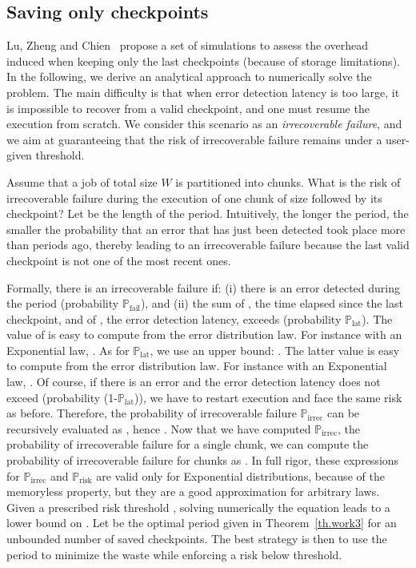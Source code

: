 \documentclass[10pt,table]{article}
\newcommand{\ema}[1]{\ensuremath{#1}\xspace}
\newcommand{\WWW}{\ema{W}}
\newcommand{\Pfa}{\ema{\mathbb{P}_{\text{fail}}}}
\newcommand{\Pfb}{\ema{\mathbb{P}_{\text{lat}}}}
\newcommand{\Pfc}{\ema{\mathbb{P}_{\text{irrec}}}}
\newcommand{\Pfd}{\ema{\mathbb{P}_{\text{risk}}}}
\begin{document}
\subsection{Saving only  checkpoints}
\label{sec.chien-k}

Lu, Zheng and Chien~\cite{LuZhengChien2013} propose a set of simulations to assess 
the overhead induced when keeping only the last  checkpoints (because of storage limitations). 
In the following, we derive an analytical approach to numerically solve the problem. 
The main difficulty is that when error detection latency is too large, it is impossible 
to recover from a valid checkpoint, and one must resume the execution from scratch. 
We consider this scenario as an \emph{irrecoverable failure}, and we aim at guaranteeing 
that the risk of  irrecoverable failure remains under a user-given threshold.

Assume that a job of total size \WWW is partitioned into  chunks. 
What is the risk of irrecoverable failure during the execution of one chunk of size  followed by its checkpoint?
 Let  be the length of the period. Intuitively, the longer the period, 
 the smaller the probability that
an error that has just been detected took place more than  periods ago, thereby leading to 
an irrecoverable failure because the last valid checkpoint is not one of the  most recent ones. 

Formally, there is an irrecoverable failure if: 
(i) there is an error detected during the period (probability \Pfa),  and 
(ii) the sum of , the time elapsed since the last checkpoint, and of  , 
the error detection latency, exceeds   (probability \Pfb). 
The value of  is easy to compute from the error distribution law. For instance with an Exponential law, . As for \Pfb, we use an upper bound:
. The latter
value is easy to compute from the error distribution law. For instance with an Exponential law, 
. Of course, if there is an error and the error detection latency 
does not exceed   (probability (1-\Pfb)), we have to restart execution and face the same risk as before.
Therefore, the probability of irrecoverable failure \Pfc can be recursively evaluated as
, hence . Now that we have computed \Pfc, the probability of irrecoverable  failure for a single chunk,
we can compute the probability of irrecoverable failure for   chunks as .
In full rigor,
these expressions for \Pfc and \Pfd are valid only for Exponential distributions, because of the memoryless property, but
they are a good approximation for arbitrary laws. Given a prescribed risk threshold ,
solving numerically the equation  leads to a
lower bound  on . Let  be the optimal period given in Theorem~\ref{th.work3}
for an unbounded number of saved checkpoints. The best strategy is then to use the period  to minimize the waste while enforcing a risk below threshold. 
\end{document}
